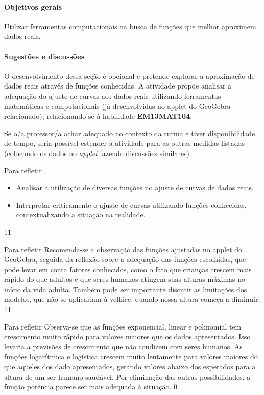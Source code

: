 \clearpage
\begin{texto}
{
\paragraph{Objetivos gerais}
Utilizar ferramentas computacionais na busca de funções que melhor aproximem dados reais.

\paragraph{Sugestões e discussões}
O desenvolvimento dessa seção é opcional e pretende explorar a aproximação de dados reais através de funções conhecidas. A atividade propõe analisar a adequação do ajuste de curvas aos dados reais utilizando ferramentas matemáticas e computacionais (já desenvolvidas no applet do GeoGebra relacionado), relacionando-se à habilidade \textbf{EM13MAT104}.

Se o/a professor/a achar adequado no contexto da turma e tiver disponibilidade de tempo, seria possível estender a atividade para as outras medidas listadas (colocando os dados no \textit{applet} fazendo discussões similares).
}
\end{texto}
\clearmargin
\begin{objectives}{Para refletir}
{
	\begin{itemize}
	\item Analisar a utilização de diversas funções no ajuste de curvas de dados reais.
	\item Interpretar criticamente o ajuste de curvas utilizando funções conhecidas, contextualizando a situação na realidade.
	\end{itemize}
}{1}{1}
\end{objectives}
\begin{sugestions}{Para refletir}
{
	Recomenda-se a observação das funções ajustadas no applet do GeoGebra, seguida da reflexão sobre a adequação das funções escolhidas, que pode levar em conta fatores conhecidos, como o fato que crianças crescem mais rápido do que adultos e que seres humanos atingem suas alturas máximas no início da vida adulta. Também pode ser importante discutir as limitações dos modelos, que não se aplicariam à velhice, quando nossa altura começa a diminuir.
}{1}{1}
\end{sugestions}

\begin{answer}{Para refletir}
{
	Observa-se que as funções exponencial, linear e polinomial tem crescimento muito rápido para valores maiores que os dados apresentados. Isso levaria a previsões de crescimento que não condizem com seres humanos. As funções logarítmica e logística crescem muito lentamente para valores maiores do que aqueles dos dado apresentados, gerando valores abaixo dos esperados para a altura de um ser humano saudável. Por eliminação das outras possibilidades, a função potência parece ser mais adequada à situação.
}{0}
\end{answer}

